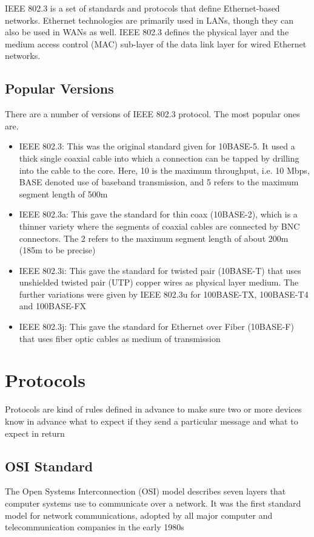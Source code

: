 \documentclass[a4paper,12pt]{article}
\begin{document}
IEEE 802.3 is a set of standards and protocols that define Ethernet-based networks. Ethernet technologies are primarily used in LANs, though they can also be used in WANs as well. IEEE 802.3 defines the physical layer and the medium access control (MAC) sub-layer of the data link layer for wired Ethernet networks.




\subsection{Popular Versions}

There are a number of versions of IEEE 802.3 protocol. The most popular ones are.



\begin{itemize}
\item{IEEE 802.3: This was the original standard given for 10BASE-5. It used a thick single coaxial cable into which a connection can be tapped by drilling into the cable to the core. Here, 10 is the maximum throughput, i.e. 10 Mbps, BASE denoted use of baseband transmission, and 5 refers to the maximum segment length of 500m}
\item{IEEE 802.3a: This gave the standard for thin coax (10BASE-2), which is a thinner variety where the segments of coaxial cables are connected by BNC connectors. The 2 refers to the maximum segment length of about 200m (185m to be precise)}
\item{IEEE 802.3i: This gave the standard for twisted pair (10BASE-T) that uses unshielded twisted pair (UTP) copper wires as physical layer medium. The further variations were given by IEEE 802.3u for 100BASE-TX, 100BASE-T4 and 100BASE-FX}
\item{IEEE 802.3j: This gave the standard for Ethernet over Fiber (10BASE-F) that uses fiber optic cables as medium of transmission}
\end{itemize}

\clearpage

\section{Protocols}

Protocols are kind of rules defined in advance to make sure two or more devices know in advance what to expect if they send a particular message and what to expect in return 

\subsection{OSI Standard}
The Open Systems Interconnection (OSI) model describes seven layers that computer systems use to communicate over a network. It was the first standard model for network communications, adopted by all major computer and telecommunication companies in the early 1980s
\end{document}
